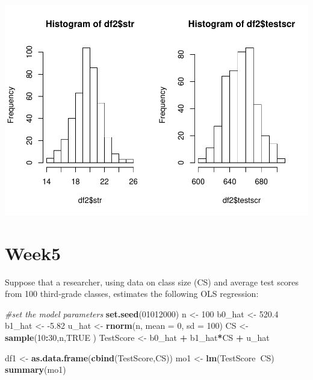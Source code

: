 \documentclass[
]{book}
\newenvironment{Shaded}{\begin{snugshade}}{\end{snugshade}}
\newcommand{\CommentTok}[1]{\textcolor[rgb]{0.56,0.35,0.01}{\textit{#1}}}
\newcommand{\DataTypeTok}[1]{\textcolor[rgb]{0.13,0.29,0.53}{#1}}
\newcommand{\DecValTok}[1]{\textcolor[rgb]{0.00,0.00,0.81}{#1}}
\newcommand{\FloatTok}[1]{\textcolor[rgb]{0.00,0.00,0.81}{#1}}
\newcommand{\KeywordTok}[1]{\textcolor[rgb]{0.13,0.29,0.53}{\textbf{#1}}}
\newcommand{\NormalTok}[1]{#1}
\newcommand{\OperatorTok}[1]{\textcolor[rgb]{0.81,0.36,0.00}{\textbf{#1}}}
\newcommand{\OtherTok}[1]{\textcolor[rgb]{0.56,0.35,0.01}{#1}}
\newcommand{\StringTok}[1]{\textcolor[rgb]{0.31,0.60,0.02}{#1}}
\begin{document}
\includegraphics{Metrics_files/figure-latex/unnamed-chunk-19-3.pdf}

\hypertarget{week5}{%
\section{Week5}\label{week5}}

Suppose that a researcher, using data on class size (CS) and average test scores from 100 third-grade classes, estimates the following OLS regression:

\begin{Shaded}
\begin{Highlighting}[]
\CommentTok{#set the model parameters}
\KeywordTok{set.seed}\NormalTok{(}\DecValTok{01012000}\NormalTok{)}
\NormalTok{n <-}\StringTok{ }\DecValTok{100}  
\NormalTok{b0_hat <-}\StringTok{ }\FloatTok{520.4} 
\NormalTok{b1_hat <-}\StringTok{ }\FloatTok{-5.82} 
\NormalTok{u_hat <-}\StringTok{  }\KeywordTok{rnorm}\NormalTok{(n, }\DataTypeTok{mean =} \DecValTok{0}\NormalTok{, }\DataTypeTok{sd =} \DecValTok{100}\NormalTok{)}
\NormalTok{CS <-}\StringTok{ }\KeywordTok{sample}\NormalTok{(}\DecValTok{10}\OperatorTok{:}\DecValTok{30}\NormalTok{,n,}\OtherTok{TRUE}\NormalTok{ )}
\NormalTok{TestScore <-}\StringTok{  }\NormalTok{b0_hat }\OperatorTok{+}\StringTok{ }\NormalTok{b1_hat}\OperatorTok{*}\NormalTok{CS }\OperatorTok{+}\StringTok{ }\NormalTok{u_hat}

\NormalTok{df1 <-}\StringTok{ }\KeywordTok{as.data.frame}\NormalTok{(}\KeywordTok{cbind}\NormalTok{(TestScore,CS)) }
\NormalTok{mo1 <-}\StringTok{ }\KeywordTok{lm}\NormalTok{(TestScore}\OperatorTok{~}\NormalTok{CS)}
\KeywordTok{summary}\NormalTok{(mo1) }
\end{Highlighting}
\end{Shaded}
\end{document}
